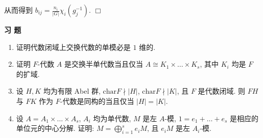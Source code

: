 \documentclass[11pt,a4paper]{article}
\begin{document}
从而得到 $b_{ij} = \frac{n_i}{|G|} \chi_i(g_j^{-1})$. \hfill $\Box$

\vspace{3em}
\begin{center}
    \Large \textbf{习 \quad 题}
\end{center}
\vspace{1.5em}

\begin{enumerate}
    \setlength{\itemsep}{10pt}
    \item 证明代数闭域上交换代数的单模必是 $1$ 维的.
    \item 证明 $F$-代数 $A$ 是交换半单代数当且仅当 $A \cong K_1 \times \dots \times K_s$, 其中 $K_i$ 均是 $F$ 的扩域.
    \item 设 $H, K$ 均为有限 Abel 群, $\mathrm{char}F \nmid |H|$, $\mathrm{char}F \nmid |K|$, 且 $F$ 是代数闭域. 则 $FH$ 与 $FK$ 作为 $F$-代数是同构的当且仅当 $|H| = |K|$.
    \item 设 $A = A_1 \times \dots \times A_s$, $A_i$ 均为单代数, $M$ 是左 $A$-模, $1 = e_1 + \dots + e_s$ 是相应的单位元的中心分解. 证明: $M = \bigoplus_{i=1}^s e_i M$, 且 $e_i M$ 是左 $A_i$-模.
\end{enumerate}
\end{document}
